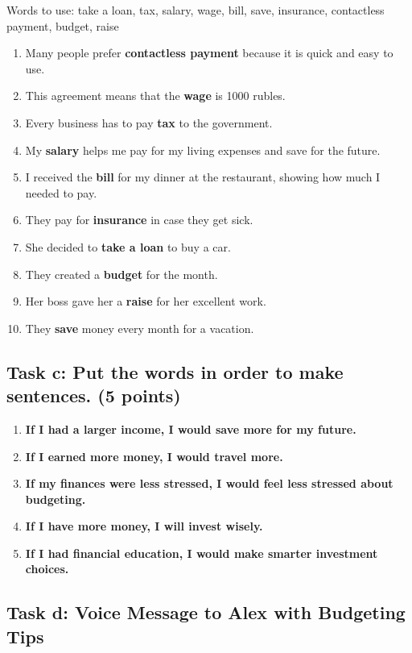 \documentclass[a4paper,12pt]{article}
\begin{document}
Words to use: take a loan, tax, salary, wage, bill, save, insurance, contactless payment, budget, raise

\begin{enumerate}
    \item Many people prefer \textbf{contactless payment} because it is quick and easy to use.
    
    \item This agreement means that the \textbf{wage} is 1000 rubles.
    
    \item Every business has to pay \textbf{tax} to the government.
    
    \item My \textbf{salary} helps me pay for my living expenses and save for the future.
    
    \item I received the \textbf{bill} for my dinner at the restaurant, showing how much I needed to pay.
    
    \item They pay for \textbf{insurance} in case they get sick.
    
    \item She decided to \textbf{take a loan} to buy a car.
    
    \item They created a \textbf{budget} for the month.
    
    \item Her boss gave her a \textbf{raise} for her excellent work.
    
    \item They \textbf{save} money every month for a vacation.
\end{enumerate}

\subsection{Task c: Put the words in order to make sentences. (5 points)}

\begin{enumerate}
    \item \textbf{If I had a larger income, I would save more for my future.}
    
    \item \textbf{If I earned more money, I would travel more.}
    
    \item \textbf{If my finances were less stressed, I would feel less stressed about budgeting.}
    
    \item \textbf{If I have more money, I will invest wisely.}
    
    \item \textbf{If I had financial education, I would make smarter investment choices.}
\end{enumerate}

\subsection{Task d: Voice Message to Alex with Budgeting Tips}
\end{document}
